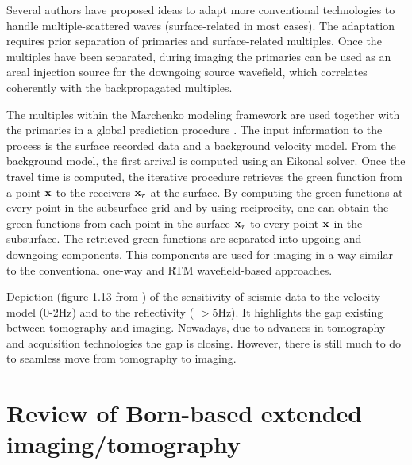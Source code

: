 Several authors \citep{GuittonAreal,VerschuurMultiples,grion2007mirror,DanWhitmore,Mandy} have 
proposed ideas to adapt more conventional technologies 
to handle multiple-scattered waves (surface-related in most cases).
 The adaptation requires prior separation of primaries and surface-related multiples. 
Once the multiples have been separated, during imaging the primaries can be 
used as an areal injection source for the downgoing source wavefield, which 
correlates coherently with the backpropagated multiples.

The multiples within the Marchenko modeling framework are used 
together with the primaries in a global prediction procedure \citep{Fil2012,Behura,Wapenaar,Singh2015}.
The input information to the process is the surface recorded data and 
a background velocity model. From the background model, the first arrival is 
computed using an Eikonal solver. Once the travel time is computed, the 
iterative procedure retrieves the green function from a point ${\bf x}$ to the receivers ${\bf x}_r$ at the surface. By 
computing the green functions at every point in the subsurface grid and  by using 
reciprocity, one can obtain the green functions from each point in the surface ${\bf x}_r$ to 
every point ${\bf x}$ in the subsurface. The retrieved green functions are separated 
into upgoing and downgoing components. This components are used for imaging 
in a way similar to the conventional one-way and RTM wavefield-based approaches. 


%
{Depiction (figure 1.13 from \cite{Claerbout:1985:IEI:3887}) of 
 the sensitivity of seismic data to the velocity model (0-2Hz) and to the reflectivity ( $> 5$Hz). It highlights
the gap existing between tomography and imaging. Nowadays, due to advances in tomography and acquisition technologies
the gap is closing. However, there is still much to do to seamless move from tomography to 
imaging.}



\section{Review of Born-based  extended imaging/tomography}
\label{sec:tomo}

